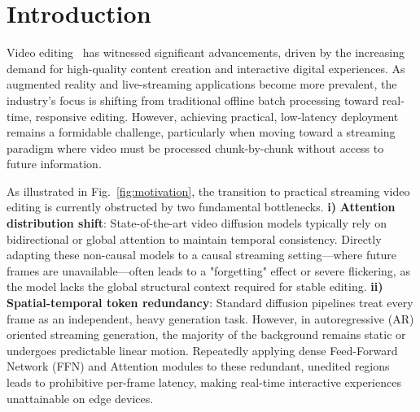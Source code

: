 

\section{Introduction}
Video editing~\cite{jiang2025vace,li2025egoedit,decart2025lucyedit,qi2023fatezero,wu2023tune,zhang2023controllable, chen2025contextflow,wang2024taming, feng2025dit4edit, wang2024cove, ma2025magicstick, yang2025unified} has witnessed significant advancements, driven by the increasing demand for high-quality content creation and interactive digital experiences. As augmented reality and live-streaming applications become more prevalent, the industry's focus is shifting from traditional offline batch processing toward real-time, responsive editing. However, achieving practical, low-latency deployment remains a formidable challenge, particularly when moving toward a streaming paradigm where video must be processed chunk-by-chunk without access to future information.

As illustrated in Fig.~\ref{fig:motivation}, the transition to practical streaming video editing is currently obstructed by two fundamental bottlenecks. {\bf i)} \textbf{Attention distribution shift}: State-of-the-art video diffusion models typically rely on bidirectional or global attention to maintain temporal consistency. Directly adapting these non-causal models to a causal streaming setting—where future frames are unavailable—often leads to a "forgetting" effect or severe flickering, as the model lacks the global structural context required for stable editing. {\bf ii)} \textbf{Spatial-temporal token redundancy}: Standard diffusion pipelines treat every frame as an independent, heavy generation task. However, in autoregressive (AR) oriented streaming generation, the majority of the background remains static or undergoes predictable linear motion. Repeatedly applying dense Feed-Forward Network (FFN) and Attention modules to these redundant, unedited regions leads to prohibitive per-frame latency, making real-time interactive experiences unattainable on edge devices.

